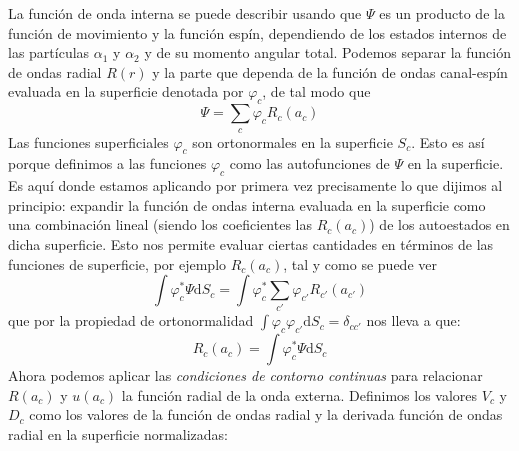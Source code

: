 \documentclass[fleqn,10pt]{SelfArx} %
\newcommand{\D}{\mathrm{d}}
\begin{document}
La función de onda interna se puede describir usando que $\Psi$ es un producto de la función de movimiento y la función espín, dependiendo de los estados internos de las partículas $\alpha_1$ y $\alpha_2$ y de su momento angular total. Podemos separar la función de ondas radial $R(r)$ y la parte que dependa de la función de ondas canal-espín evaluada en la superficie denotada por $\varphi_c$, de tal modo que 
\begin{equation}
	\Psi = \sum_c \varphi_c R_c (a_c)
\end{equation}
Las funciones superficiales $\varphi_c$ son ortonormales en la superficie $S_c$. Esto es así porque definimos a las funciones $\varphi_c$ como las autofunciones de $\Psi$ en la superficie. Es aquí donde estamos aplicando por primera vez precisamente lo que dijimos al principio: expandir la función de ondas interna evaluada en la superficie como una combinación lineal (siendo los coeficientes las $R_c(a_c)$) de los autoestados en dicha superficie. Esto nos permite evaluar ciertas cantidades en términos de las funciones de superficie, por ejemplo $R_c(a_c)$, tal y como se puede ver
\begin{equation*}
	\int \varphi_{c}^* \Psi \D S_c = \int \varphi_{c}^* \sum_{c'} \varphi_{c'} R_{c'} (a_{c'})
\end{equation*}
que por la propiedad de ortonormalidad $\int \varphi_{c} \varphi_{c'} \D S_c = \delta_{cc'}$ nos lleva a que:
\begin{equation}
	R_c (a_c) = \int \varphi_c^* \Psi \D S_c
\end{equation}
Ahora podemos aplicar las \textit{condiciones de contorno continuas} para relacionar $R(a_c)$ y $u(a_c)$ la función radial de la onda externa. Definimos los valores $V_c$ y $D_c$ como los valores de la función de ondas radial y la derivada función de ondas radial en la superficie normalizadas: 
\end{document}
